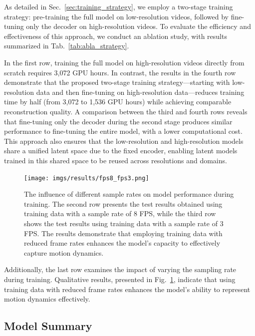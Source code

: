 \documentclass{article} %
\begin{document}
As detailed in Sec.~\ref{sec:training_strategy}, we employ a two-stage training strategy: pre-training the full model on low-resolution videos, followed by fine-tuning only the decoder on high-resolution videos. To evaluate the efficiency and effectiveness of this approach, we conduct an ablation study, with results summarized in Tab.~\ref{tab:abla_strategy}.

In the first row, training the full model on high-resolution videos directly from scratch requires 3,072 GPU hours. In contrast, the results in the fourth row demonstrate that the proposed two-stage training strategy—starting with low-resolution data and then fine-tuning on high-resolution data—reduces training time by half (from 3,072 to 1,536 GPU hours) while achieving comparable reconstruction quality. A comparison between the third and fourth rows reveals that fine-tuning only the decoder during the second stage produces similar performance to fine-tuning the entire model, with a lower computational cost. This approach also ensures that the low-resolution and high-resolution models share a unified latent space due to the fixed encoder, enabling latent models trained in this shared space to be reused across resolutions and domains.

\begin{figure}[t]
  \centering
  \texttt{[image: imgs/results/fps8\_fps3.png]}
  \caption{The influence of different sample rates on model performance during training. The second row presents the test results obtained using training data with a sample rate of 8 FPS, while the third row shows the test results using training data with a sample rate of 3 FPS. The results demonstrate that employing training data with reduced frame rates enhances the model's capacity to effectively capture motion dynamics.}
  \label{fig:fps8_fps3}
\end{figure}

Additionally, the last row examines the impact of varying the sampling rate during training. Qualitative results, presented in Fig.~\ref{fig:fps8_fps3}, indicate that using training data with reduced frame rates enhances the model’s ability to represent motion dynamics effectively.


\subsection{Model Summary}
\end{document}
